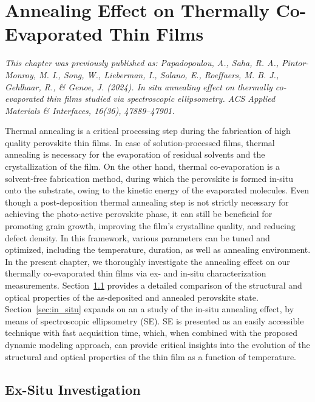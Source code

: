 \chapter{Annealing Effect on Thermally Co-Evaporated  Thin Films}\label{ch:ellipsometry}

\textit{This chapter was previously published as: Papadopoulou, A., Saha, R. A., Pintor-Monroy, M. I., Song, W., Lieberman, I., Solano, E., Roeffaers, M. B. J., Gehlhaar, R., \& Genoe, J. (2024). In situ annealing effect on thermally co-evaporated  thin films studied via spectroscopic ellipsometry. ACS Applied Materials \& Interfaces, 16(36), 47889–47901.}

\vspace{2em}


Thermal annealing is a critical processing step during the fabrication of high quality perovskite thin films. In case of solution-processed films, thermal annealing is necessary for the evaporation of residual solvents and the crystallization of the film. On the other hand, thermal co-evaporation is a solvent-free fabrication method, during which the perovskite is formed in-situ onto the substrate, owing to the kinetic energy of the evaporated molecules. Even though a post-deposition thermal annealing step is not strictly necessary for achieving the photo-active perovskite phase, it can still be beneficial for promoting grain growth, improving the film's crystalline quality, and reducing defect density. In this framework, various parameters can be tuned and optimized, including the temperature, duration, as well as annealing environment. In the present chapter, we thoroughly investigate the annealing effect on our thermally co-evaporated  thin films via ex- and in-situ characterization measurements. Section~\ref{sec:ex_situ} provides a detailed comparison of the structural and optical properties of the as-deposited and annealed perovskite state. Section~\ref{sec:in_situ} expands on an a study of the in-situ annealing effect, by means of spectroscopic ellipsometry (SE). SE is presented as an easily accessible technique with fast acquisition time, which, when combined with the proposed dynamic modeling approach, can provide critical insights into the evolution of the structural and optical properties of the thin film as a function of temperature. 


\section{Ex-Situ Investigation}\label{sec:ex_situ}

